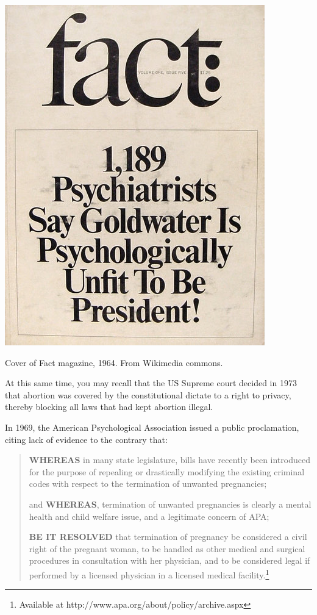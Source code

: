 \begin{refsection}
\begin{marginfigure}
\begin{center}
     \includegraphics{../images/Goldwater_fact_magazine.jpg}
\end{center}
 \caption{Cover of Fact magazine, 1964. From Wikimedia commons.}
\label{fig: 1964Fact}
\end{marginfigure}


At this same time, you may recall that the US Supreme court decided in 1973 that abortion was covered by the constitutional dictate to a right to privacy, thereby blocking all laws that had kept abortion illegal.

In 1969, the American Psychological Association issued a public proclamation, citing lack of evidence to the contrary that:

\begin{quote}

\textbf{WHEREAS} in many state legislature, bills have recently been introduced for the purpose of repealing or drastically modifying the existing criminal codes with respect to the termination of unwanted pregnancies;

and \textbf{WHEREAS}, termination of unwanted pregnancies is clearly a mental health and child welfare issue, and a legitimate concern of APA;

\textbf{BE IT RESOLVED} that termination of pregnancy be considered a civil right of the pregnant woman, to be handled as other medical and surgical procedures in consultation with her physician, and to be considered legal if performed by a licensed physician in a licensed medical facility.\footnote{Available at http:\slash \slash www.apa.org\slash about\slash policy\slash archive.aspx}
\end{quote}


\end{refsection}
